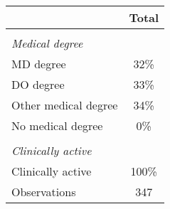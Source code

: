 \begin{tabular}{lc}
\toprule
\addlinespace
 & Total\\
\hline
\vspace{0.01em} \\ \emph{Medical degree} \\
\hspace{0.25cm} MD degree & 32\% \\
\hspace{0.25cm} DO degree & 33\% \\
\hspace{0.25cm} Other medical degree & 34\% \\
\hspace{0.25cm} No medical degree & 0\% \\
\vspace{0.01em} \\ \emph{Clinically active} \\
\hspace{0.25cm} Clinically active & 100\% \\
\hline
Observations & 347 \\
\bottomrule
\end{tabular}
